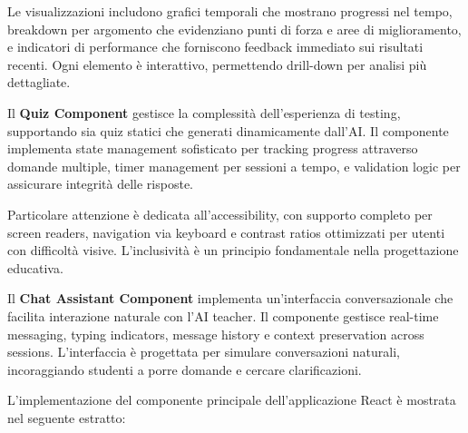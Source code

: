 \documentclass[12pt,a4paper]{article}
\begin{document}
Le visualizzazioni includono grafici temporali che mostrano progressi nel tempo, breakdown per argomento che evidenziano punti di forza e aree di miglioramento, e indicatori di performance che forniscono feedback immediato sui risultati recenti. Ogni elemento è interattivo, permettendo drill-down per analisi più dettagliate.

Il \textbf{Quiz Component} gestisce la complessità dell'esperienza di testing, supportando sia quiz statici che generati dinamicamente dall'AI. Il componente implementa state management sofisticato per tracking progress attraverso domande multiple, timer management per sessioni a tempo, e validation logic per assicurare integrità delle risposte.

Particolare attenzione è dedicata all'accessibility, con supporto completo per screen readers, navigation via keyboard e contrast ratios ottimizzati per utenti con difficoltà visive. L'inclusività è un principio fondamentale nella progettazione educativa.

Il \textbf{Chat Assistant Component} implementa un'interfaccia conversazionale che facilita interazione naturale con l'AI teacher. Il componente gestisce real-time messaging, typing indicators, message history e context preservation across sessions. L'interfaccia è progettata per simulare conversazioni naturali, incoraggiando studenti a porre domande e cercare clarificazioni.

L'implementazione del componente principale dell'applicazione React è mostrata nel seguente estratto:
\end{document}
